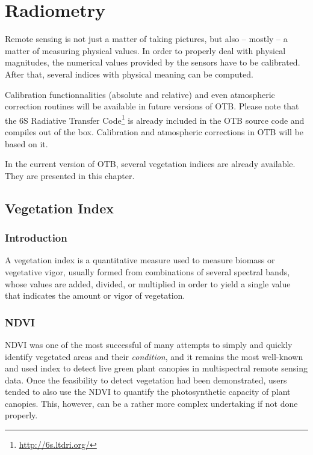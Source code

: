 \chapter{Radiometry}

Remote sensing is not just a matter of taking pictures, but also --
mostly -- a matter of measuring physical values. In order to properly
deal with physical magnitudes, the numerical values provided by the
sensors have to be calibrated. After that, several indices with
physical meaning can be computed.

Calibration functionnalities (absolute and relative) and even
atmospheric correction routines will be available in future versions
of OTB. Please note that the 6S Radiative Transfer Code\footnote{\url{http://6s.ltdri.org/}} is already included in the OTB source code and
compiles out of the box. Calibration and atmospheric corrections in
OTB will be based on it.

In the current version of OTB, several vegetation indices are already
available. They are presented in this chapter.


\section{Vegetation Index}
\label{sec:VegetationIndex}

\subsection{Introduction}
A vegetation index is a quantitative measure used to measure biomass
or vegetative vigor, usually formed from combinations of several
spectral bands, whose values are added, divided, or multiplied in
order to yield a single value that indicates the amount or vigor of
vegetation.

\subsection{NDVI}
\label{secNDVI}
NDVI was one of the most successful of many attempts to simply and
quickly identify vegetated areas and their {\em condition}, and it remains
the most well-known and used index to detect live green plant canopies
in multispectral remote sensing data. Once the feasibility to detect
vegetation had been demonstrated, users tended to also use the NDVI to
quantify the photosynthetic capacity of plant canopies. This, however,
can be a rather more complex undertaking if not done properly.


